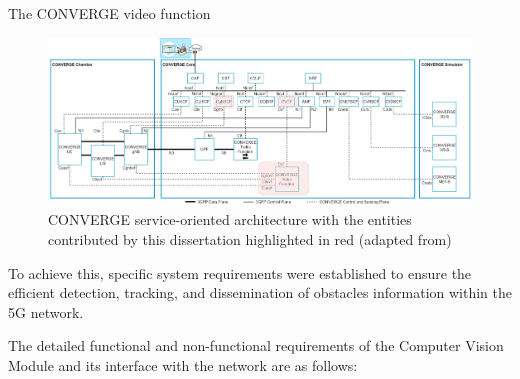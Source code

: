 The CONVERGE video function
\begin{figure}[H]
    \centering
    \includegraphics[width=0.7\linewidth]{figures/converge_my_work.drawio}
    \caption[CONVERGE service-oriented architecture with the entities contributed by this dissertation highlighted in red]{CONVERGE service-oriented architecture with the entities contributed by this dissertation highlighted in red (adapted from\cite{converge2023_specs})}
    \label{fig:my_chamber}
\end{figure}

To achieve this, specific system requirements were established to ensure the efficient detection, tracking, and dissemination of obstacles information within the 5G network.

The detailed functional and non-functional requirements of the Computer Vision Module and its interface with the network are as follows:

